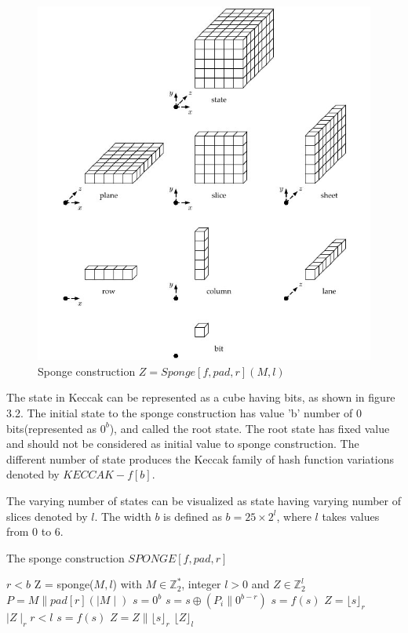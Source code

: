   \begin{figure}
    \begin{center}
      \includegraphics[width=6.5in]{keccakstateterminology.jpg}
    \end{center}
    \caption{Sponge construction $Z = Sponge[f, pad, r](M, l)$ \cite{00015}}
    \label{fig:lab}
  \end{figure}

  The state in Keccak can be represented as a cube having bits, as shown in figure 3.2. The initial state to the sponge
  construction has value 'b' number of 0 bits(represented as $0^{b}$), and called the root state. The root state has fixed
  value and should not be considered as initial value to sponge construction. The different number of state produces
  the Keccak family of hash function variations denoted by $KECCAK-f[b]$.
  
  The varying number of states can be visualized as state having varying number of slices denoted by $l$. The width $b$ is
  defined as $b = 25 \times 2^{l}$, where $l$ takes values from 0 to 6.
  
  \begin{algorithm}
    \caption{The sponge construction $SPONGE[f, pad, r]$ \cite{00016}}
    \begin{algorithmic}[1]
      \Require $r < b$
       Z = sponge($M, l$) with $M \in \mathbb{Z}^{*}_{2}$, integer $ l > 0$ and $Z \in \mathbb{Z}^{l}_{2}$
      \State $P = M \parallel pad[r](\mid M \mid)$
      \State $s = 0^{b}$
        \State $s = s \oplus ( P_{i} \parallel 0^{b - r})$
        \State $s = f(s)$
      \EndFor
      \State $ Z = \lfloor s \rfloor_{r}$
      \While $\mid Z \mid_{r} r < l $
        \State $s = f(s)$
        \State $Z = Z \parallel \lfloor s \rfloor_{r}$
      \EndWhile
      \State \Return $\lfloor Z \rfloor_{l}$ 
    \end{algorithmic}
  \end{algorithm}

